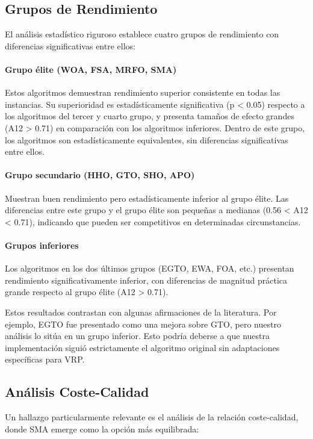 \documentclass[conference,a4paper]{IEEEtran}
\begin{document}
\subsection{Grupos de Rendimiento}

El análisis estadístico riguroso establece cuatro grupos de rendimiento con diferencias significativas entre ellos:

\paragraph{Grupo élite (WOA, FSA, MRFO, SMA)} Estos algoritmos demuestran rendimiento superior consistente en todas las instancias. Su superioridad es estadísticamente significativa (p < 0.05) respecto a los algoritmos del tercer y cuarto grupo, y presenta tamaños de efecto grandes (A12 > 0.71) en comparación con los algoritmos inferiores. Dentro de este grupo, los algoritmos son estadísticamente equivalentes, sin diferencias significativas entre ellos.

\paragraph{Grupo secundario (HHO, GTO, SHO, APO)} Muestran buen rendimiento pero estadísticamente inferior al grupo élite. Las diferencias entre este grupo y el grupo élite son pequeñas a medianas (0.56 < A12 < 0.71), indicando que pueden ser competitivos en determinadas circunstancias.

\paragraph{Grupos inferiores} Los algoritmos en los dos últimos grupos (EGTO, EWA, FOA, etc.) presentan rendimiento significativamente inferior, con diferencias de magnitud práctica grande respecto al grupo élite (A12 > 0.71).

Estos resultados contrastan con algunas afirmaciones de la literatura. Por ejemplo, EGTO \cite{Hassan2024EGTO} fue presentado como una mejora sobre GTO, pero nuestro análisis lo sitúa en un grupo inferior. Esto podría deberse a que nuestra implementación siguió estrictamente el algoritmo original sin adaptaciones específicas para VRP.

\subsection{Análisis Coste-Calidad}

Un hallazgo particularmente relevante es el análisis de la relación coste-calidad, donde SMA emerge como la opción más equilibrada:
\end{document}
